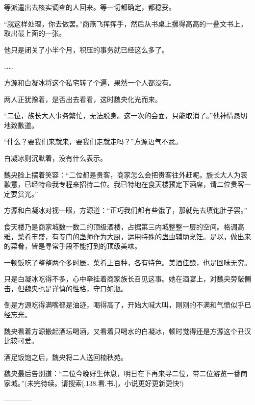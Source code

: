 \begin{this_body}
等派遣出去核实调查的人回来。等一切都确定，都稳妥。

“就这样处理，你去做罢。”商燕飞挥挥手，然后从书桌上摞得高高的一叠文书上，取出最上面的一张。

他只是闭关了小半个月，积压的事务就已经这么多了。

……

方源和白凝冰将这个私宅转了个遍，果然一个人都没有。

两人正犹豫着，是否出去看看，这时魏央化光而来。

“二位，族长大人事务繁忙，无法脱身。这一次的会面，只能取消了。”他神情恳切地致歉道。

“什么？要我们来就来，要我们走就走吗？”方源语气不忿。

白凝冰则沉默着，没有什么表示。

魏央脸上摆着笑容：“二位都是贵客，商家怎么会把贵客往外赶呢。族长大人为表歉意，已经特命我专程来招待二位。我已特地在食天楼预定下酒席，请二位贵客一定要赏光。”

方源和白凝冰对视一眼，方源道：“正巧我们都有些饿了，那就先去填饱肚子罢。”

食天楼乃是商家城数一数二的顶级酒楼，占据第三内城整整一层的空间。格调高雅，菜肴丰盛，有专门的蛊师作为大厨，运用特殊的蛊虫辅助烹饪。是以，做出来的菜肴，皆是寻常手段不能打到的顶级美味。

一顿饭吃了整整两个多时辰，菜肴上百种，各有特色。美酒佳酿，也是回味无穷。

只是白凝冰吃得不多，心中牵挂着商家族长召见这事。她在酒宴上，对魏央旁敲侧击，但魏央也是谨慎的性格，守口如瓶。

倒是方源吃得满嘴都是油迹，喝得高了，开始大喊大叫，刚刚的不满和气愤似乎已经忘光。

魏央看着方源搬起酒坛喝酒，又看着只喝水的白凝冰，顿时觉得还是方源这个丑汉比较可爱。

酒足饭饱之后，魏央将二人送回楠秋苑。

魏央最后告别道：“二位今晚好生休息，明日在下再来寻二位，带二位游览一番商家城。”(未完待续。请搜索[.138.看.书.]，小说更好更新更快!)

------------

\end{this_body}

